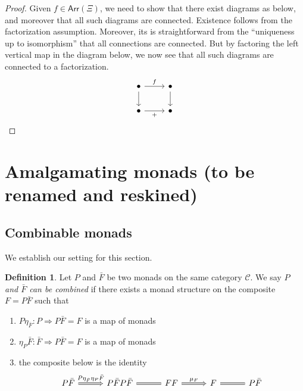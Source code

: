 \documentclass[a4paper,10pt
,draft
]{article}%
\numberwithin{equation}{section}
\numberwithin{figure}{section}
\theoremstyle{definition} %
\newtheorem{definition}[equation]{Definition}%
\newcommand{\1}{\ensuremath{\mathbbm 1}}%
\begin{document}
\begin{proof}
Given $f \in \mathsf{Arr}(\Xi)$, we need to show that there exist diagrams as below, and moreover that all such diagrams are connected. 
Existence follows from the factorization assumption. Moreover, its is straightforward from the ``uniqueness up to isomorphism'' that all connections are connected.
But by factoring the left vertical map in the diagram below, we now see that all such diagrams are connected to a factorization.
\[
\begin{tikzcd}
	\bullet \ar{r}{f} \ar{d}& 
	\bullet \ar{d}
\\
	\bullet \ar{r}[swap]{+} &
	\bullet
\end{tikzcd}
\]
%
\end{proof}






\newpage
\appendix


\section{Amalgamating monads (to be renamed and reskined)}
\label{AMALGMON_SEC}

\subsection{Combinable monads}
\label{COMBMON_SEC}

We establish our setting for this section.

\begin{definition}\label{AMALGMON DEF}
Let $P$ and $\bar{F}$ be two monads on the same category $\mathcal{C}$.
We say \emph{$P$ and $\bar{F}$ can be combined} if there exists 
a monad structure on the composite 
$F = P \bar{F}$ such that
\begin{enumerate}[label=(\roman*)]
\item $P \eta_{\bar{F}} \colon P \Rightarrow P \bar{F} = F$
is a map of monads
\item $\eta_P \bar{F} \colon \bar{F} \Rightarrow P \bar{F} = F$
is a map of monads
\item the composite below is the identity
\[
\begin{tikzcd}[column sep=3em]
	P \bar{F} \ar[Rightarrow]{r}{P \eta_{\bar{F}} \eta_P \bar{F}}
&
	P \bar{F} P \bar{F} \ar[equal]{r}
&
	FF  \ar[Rightarrow]{r}{\mu_F}
&
	F \ar[equal]{r}
&
	P \bar{F}
\end{tikzcd}
\]
\end{enumerate}
\end{definition}
\end{document}
